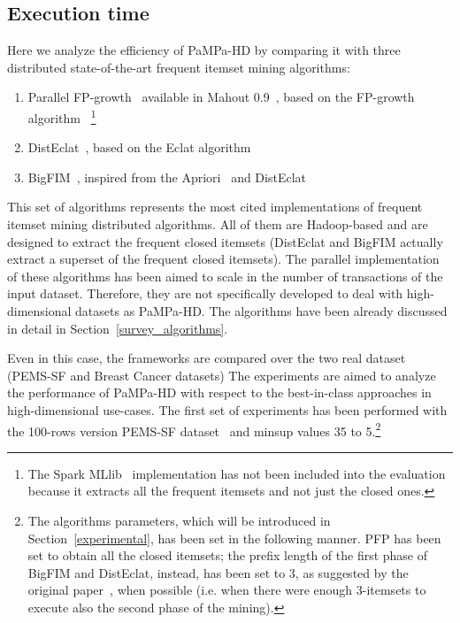 \subsection{Execution time}\label{running_time}
Here we analyze the efficiency of PaMPa-HD by comparing it 
with three distributed state-of-the-art frequent itemset mining algorithms:

\begin{enumerate}

\item Parallel FP-growth~\cite{pfpgrowth} 
available in Mahout 0.9~\cite{mahout2}, 
based on the FP-growth algorithm~\cite{Han00} \footnote{The Spark MLlib~\cite{citeulike:13636750} implementation has not been included into the evaluation because it extracts all the frequent itemsets and not just the closed ones.}

\item DistEclat~\cite{bigfim}, based on the Eclat algorithm~\cite{Zaki97newalgorithms}

\item BigFIM~\cite{bigfim}, inspired from the Apriori~\cite{Agr94} and DistEclat
\end{enumerate}

This set of algorithms represents the most cited implementations 
of frequent itemset mining distributed algorithms. 
All of them are Hadoop-based and are designed to extract 
the frequent closed itemsets 
(DistEclat and BigFIM actually extract a superset of the frequent closed itemsets).
The parallel implementation of these algorithms has been aimed to scale in the number of transactions of the input dataset. Therefore, they are not specifically developed to deal with
high-dimensional datasets as PaMPa-HD.
The algorithms have been already discussed in detail in Section~\ref{survey_algorithms}.

Even in this case, the frameworks are compared over the two real dataset (PEMS-SF and Breast Cancer datasets) The experiments are aimed to analyze the performance of PaMPa-HD with respect to the best-in-class approaches in high-dimensional use-cases. 
The first set of experiments has been performed with the 100-rows version PEMS-SF dataset~\cite{uci} and minsup values 35 to 5.\footnote{The algorithms parameters, which will be introduced in Section~\ref{experimental}, has been set in the following manner. PFP has been set to obtain all the closed itemsets; the prefix length of the first phase of BigFIM and DistEclat, instead, has been set to 3, as suggested by the original paper~\cite{bigfim}, when possible (i.e. when there were enough 3-itemsets to execute also the second phase of the mining).}

